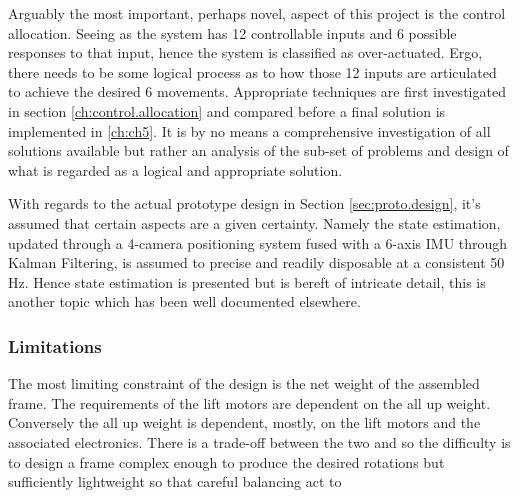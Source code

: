 \par
Arguably the most important, perhaps novel, aspect of this project is the control allocation. Seeing as the system has 12 controllable inputs and 6 possible responses to that input, hence the system is classified as over-actuated. Ergo, there needs to be some logical process as to how those 12 inputs are articulated to achieve the desired 6 movements. Appropriate techniques are first investigated in section \ref{ch:control.allocation} and compared before a final solution is implemented in \ref{ch:ch5}. It is by no means a comprehensive investigation of all solutions available but rather an analysis of the sub-set of problems and design of what is regarded as a logical and appropriate solution.
\par
With regards to the actual prototype design in Section \ref{sec:proto.design}, it's assumed that certain aspects are a given certainty. Namely the state estimation, updated through a 4-camera positioning system fused with a 6-axis IMU through Kalman Filtering, is assumed to precise and readily disposable at a consistent 50 Hz. Hence state estimation is presented but is bereft of intricate detail, this is another topic which has been well documented elsewhere.
\subsubsection{Limitations}
\label{subsubsec:intro.foreward.limits}
The most limiting constraint of the design is the net weight of the assembled frame. The requirements of the lift motors are dependent on the all up weight. Conversely the all up weight is dependent, mostly, on the lift motors and the associated electronics. There is a trade-off between the two and so the difficulty is to design a frame complex enough to produce the desired rotations but sufficiently lightweight so that 
 careful balancing act to 

